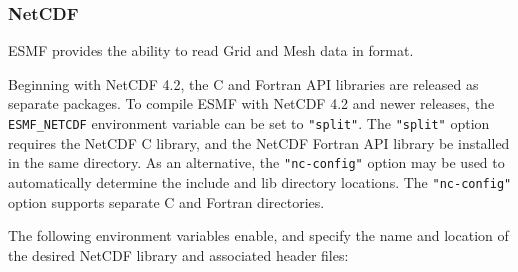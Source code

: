 \subsubsection{NetCDF}
\label{sec:netcdf}
ESMF provides the ability to read Grid and Mesh data in 
 format. 

Beginning with NetCDF 4.2, the C and Fortran API libraries are released as separate packages.
To compile ESMF with NetCDF 4.2 and newer releases, the {\tt ESMF\_NETCDF} environment variable
can be set to {\tt "split"}.  The {\tt "split"} option requires the NetCDF C library, 
and the NetCDF Fortran API library be installed in the same directory.  As an alternative,
the {\tt "nc-config"} option may be used to automatically determine the include and lib directory
locations.  The {\tt "nc-config"} option supports separate C and Fortran directories.


The following environment variables enable, and specify the name and location
of the desired NetCDF library and associated header files:

